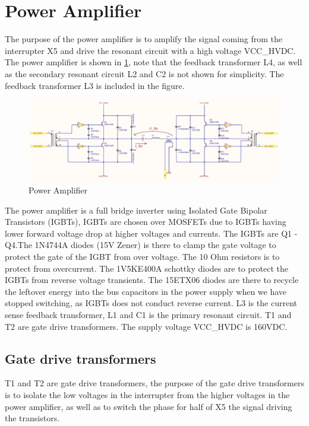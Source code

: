 \newpage
\section{Power Amplifier}

The purpose of the power amplifier is to amplify the signal coming from the interrupter X5 and drive the resonant circuit with a high voltage VCC\_HVDC. The power amplifier is shown in \cref{fig:tk531}, note that the feedback transformer L4, as well as the secondary resonant circuit L2 and C2 is not shown for simplicity. The feedback transformer L3 is included in the figure.

\begin{figure}[h!]
    \centering
    \includegraphics[width=0.9\textheight,angle=-90]{Skjema/TK531_Utgangstrinn_r.pdf}
    \caption{Power Amplifier}
    \label{fig:tk531}
\end{figure}

The power amplifier is a full bridge inverter using Isolated Gate Bipolar Transistors (IGBTs), IGBTs are chosen over MOSFETs due to IGBTs having lower forward voltage drop at higher voltages and currents. The IGBTs are Q1 - Q4.The 1N4744A diodes (15V Zener) is there to clamp the gate voltage to protect the gate of the IGBT from over voltage. The 10 Ohm resistors is to protect from overcurrent. The 1V5KE400A schottky diodes are to protect the IGBTs from reverse voltage transients. The 15ETX06 diodes are there to recycle the leftover energy into the bus capacitors in the power supply when we have stopped switching, as IGBTs does not conduct reverse current. L3 is the current sense feedback transformer, L1 and C1 is the primary resonant circuit. T1 and T2 are gate drive transformers. The supply voltage VCC\_HVDC is 160VDC.

\subsection{Gate drive transformers}
T1 and T2 are gate drive transformers, the purpose of the gate drive transformers is to isolate the low voltages in the interrupter from the higher voltages in the power amplifier, as well as to switch the phase for half of X5 the signal driving the transistors.

